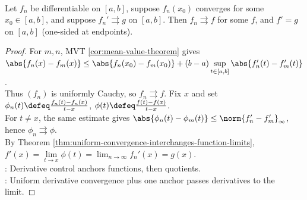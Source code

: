 \begin{theorem} \label{thm:uniform-derivative-convergence} \\
Let $f_n$ be differentiable on $[a,b]$, suppose $f_n(x_0)$ converges for some $x_0\in[a,b]$, and suppose $f_n'\rightrightarrows g$ on $[a,b]$. Then $f_n\rightrightarrows f$ for some $f$, and $f'=g$ on $[a,b]$ (one-sided at endpoints).
\begin{proof}
For $m,n$, MVT \ref{cor:mean-value-theorem} gives $\abs{f_n(x)-f_m(x)}\leq \abs{f_n(x_0)-f_m(x_0)}+(b-a)\sup\limits_{t\in[a,b]}\abs{f_n'(t)-f_m'(t)}$.\\
Thus $(f_n)$ is uniformly Cauchy, so $f_n\rightrightarrows f$. Fix $x$ and set $\phi_n(t)\defeq\frac{f_n(t)-f_n(x)}{t-x}$, $\phi(t)\defeq\frac{f(t)-f(x)}{t-x}$.\\
For $t\neq x$, the same estimate gives $\abs{\phi_n(t)-\phi_m(t)}\leq\norm{f_n'-f_m'}_{\infty}$, hence $\phi_n\rightrightarrows\phi$.\\
By Theorem \ref{thm:uniform-convergence-interchanges-function-limits}, $f'(x)=\lim\limits_{t\to x}\phi(t)=\lim_{n\to\infty}f_n'(x)=g(x)$.\\
: Derivative control anchors functions, then quotients.\\
: Uniform derivative convergence plus one anchor passes derivatives to the limit.
\end{proof}
\end{theorem}

